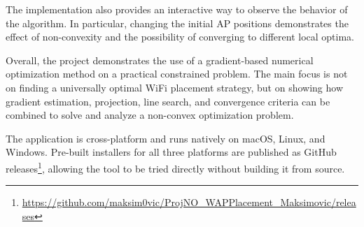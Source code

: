 \documentclass[11pt]{article}
\begin{document}
The implementation also provides an interactive way to observe the
behavior of the algorithm. In particular, changing the initial AP
positions demonstrates the effect of non-convexity and the possibility
of converging to different local optima.

Overall, the project demonstrates the use of a gradient-based numerical
optimization method on a practical constrained problem. The main focus
is not on finding a universally optimal WiFi placement strategy, but on
showing how gradient estimation, projection, line search, and
convergence criteria can be combined to solve and analyze a
non-convex optimization problem.

The application is cross-platform and runs natively on macOS, Linux,
and Windows. Pre-built installers for all three platforms are
published as GitHub releases\footnote{\url{https://github.com/maksim0vic/ProjNO_WAPPlacement_Maksimovic/releases}},
allowing the tool to be tried directly without building it from
source.

  
  
\end{document}
